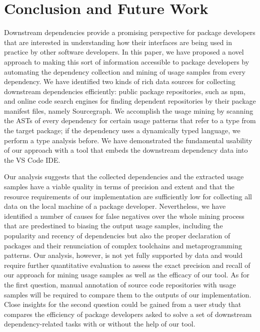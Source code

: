 \section{Conclusion and Future Work}
\label{sec:conclusion}

Downstream dependencies provide a promising perspective for package developers that are interested in understanding how their interfaces are being used in practice by other software developers.
In this paper, we have proposed a novel approach to making this sort of information accessible to package developers by automating the dependency collection and mining of usage samples from every dependency.
We have identified two kinds of rich data sources for collecting downstream dependencies efficiently: public package repositories, such as npm, and online code search engines for finding dependent repositories by their package manifest files, namely Sourcegraph.
We accomplish the usage mining by scanning the ASTs of every dependency for certain usage patterns that refer to a type from the target package; if the dependency uses a dynamically typed language, we perform a type analysis before.
We have demonstrated the fundamental usability of our approach with a tool that embeds the downstream dependency data into the VS Code IDE.

Our analysis suggests that the collected dependencies and the extracted usage samples have a viable quality in terms of precision and extent and that the resource requirements of our implementation are sufficiently low for collecting all data on the local machine of a package developer.
Nevertheless, we have identified a number of causes for false negatives over the whole mining process that are predestined to biasing the output usage samples, including the popularity and recency of dependencies but also the proper declaration of packages and their renunciation of complex toolchains and metaprogramming patterns.
Our analysis, however, is not yet fully supported by data and would require further quantitative evaluation to assess the exact precision and recall of our approach for mining usage samples as well as the efficacy of our tool.
As for the first question, manual annotation of source code repositories with usage samples will be required to compare them to the outputs of our implementation.
Close insights for the second question could be gained from a user study that compares the efficiency of package developers asked to solve a set of downstream dependency-related tasks with or without the help of our tool.

